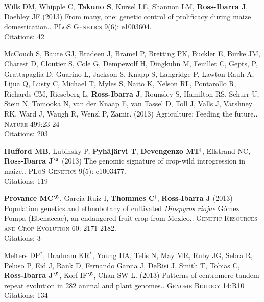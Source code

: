 \documentclass[letterpaper,10pt]{article}
\begin{document}
\begin{etaremune}
\item Wills DM, Whipple C, {\bf Takuno S}, Kursel LE, Shannon LM, {\bf Ross-Ibarra J}, Doebley JF (2013) From many, one: genetic control of prolificacy during maize domestication.. \textsc{PLoS Genetics} 9(6): e1003604. %
\\Citations: 42\\


\item McCouch S, Baute GJ, Bradeen J, Bramel P, Bretting PK, Buckler E, Burke JM, Charest D, Cloutier S, Cole G, Dempewolf H, Dingkuhn M, Feuillet C, Gepts, P, Grattapaglia D, Guarino L, Jackson S, Knapp S, Langridge P, Lawton-Rauh A, Lijua Q, Lusty C, Michael T, Myles S, Naito K, Nelson RL, Pontarollo R, Richards CM, Rieseberg L, {\bf Ross-Ibarra J}, Rounsley S, Hamilton RS, Schurr U, Stein N, Tomooka N, van der Knaap E, van Tassel D, Toll J, Valls J, Varshney RK, Ward J, Waugh R, Wenzl P, Zamir. (2013) Agriculture: Feeding the future.. \textsc{Nature} 499:23-24
\\Citations: 203\\


\item {\bf Hufford MB}, Lubinsky P, {\bf Pyh\"aj\"arvi T}, {\bf Devengenzo MT}$^\ddagger$, Ellstrand NC, {\bf Ross-Ibarra J}$^\S$ (2013) The genomic signature of crop-wild introgression in maize.. \textsc{PLoS Genetics} 9(5): e1003477. %
\\Citations: 119\\


\item {\bf Provance MC}$^\S$, Garcia Ruiz I, {\bf Thommes C}$^\ddagger$, {\bf Ross-Ibarra J} (2013) Population genetics and ethnobotany of cultivated \emph{Diospyros riojae} G\'omez Pompa (Ebenaceae), an endangered fruit crop from Mexico.. \textsc{Genetic Resources and Crop Evolution} 60: 2171-2182.
\\Citations: 3\\


\item Melters DP$^*$, Bradnam KR$^*$, Young HA, Telis N, May MR, Ruby JG, Sebra R, Peluso P, Eid J, Rank D, Fernando Garcia J, DeRisi J, Smith T, Tobias C, {\bf Ross-Ibarra J}$^\S$, Korf IF$^\S$, Chan SW-L. (2013) Patterns of centromere tandem repeat evolution in 282 animal and plant genomes.. \textsc{Genome Biology} 14:R10
\\Citations: 134\\



\end{etaremune}
\end{document}
